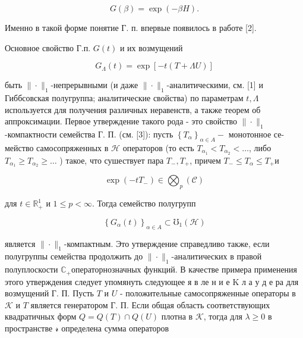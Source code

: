 \documentclass[10pt]{article}
\begin{document}
\[

G(\beta)=\exp (-\beta H) .

\]



Именно в такой форме понятие Г. п. впервые появилось в работе [2].



Основное свойство Г.п. $G(t)$ и их возмущений



\[

G_{\Lambda}(t)=\exp [-t(T+\Lambda U)]

\]



быть $\|\cdot\|_{1}$-непрерывными (и даже $\|\cdot\|_{1}$-аналитическими, см. [1] и Гиббсовская полугруппа; аналитические свойства) по параметрам $t, \Lambda$ используется для получения различных неравенств, а также теорем об аппроксимации. Первое утверждение такого рода - это свойство $\|\cdot\|_{1}$-компактности семейства Г. П. (см. [3]): пусть $\left\{T_{\alpha}\right\}_{\alpha \in A}-$ монотонное се- мейство самосопряженных в $\mathscr{H}$ операторов (то есть $T_{\alpha_{1}}<T_{\alpha_{2}}<\ldots$, либо $T_{\alpha_{1}} \geqslant T_{\alpha_{2}} \geqslant \ldots$ ) такое, что сушествует пара $T_{-}, T_{+}$, причем $T_{-} \leqslant T_{\alpha} \leqslant T_{+}$и



\[

\exp \left(-t T_{-}\right) \in \bigotimes_{p}(\mathscr{C})

\]



для $t \in \mathbb{R}_{+}^{1}$ и $1 \leqslant p<\infty$. Тогда семейство полугрупп



\[

\left\{G_{\alpha}(t)\right\}_{\alpha \in A} \subset \mho_{1}(\mathscr{H})

\]



является $\|\cdot\|_{1}$-компактным. Это утверждение справедливо также, если полугруппы семейства продолжить до $\|\cdot\|_{1}$-аналитических в правой полуплоскости $\mathbb{C}_{+}$операторнозначных функций. В качестве примера применения этого утверждения следует упомянуть следующее я в ле н и е K л а у д е ра для возмущений $Г$. П. Пусть $T$ и $U$ - положительные самосопряженные операторы в $\mathscr{\mathcal { K }}$ и $T$ является генератором Г. П. Если общая область соответствующих квадратичных форм $Q=Q(T) \cap Q(U)$ плотна в $\mathscr{K}$, тогда для $\lambda \geqslant 0$ в пространстве $\mathscr{\mathscr { r }}$ определена сумма операторов
\end{document}
